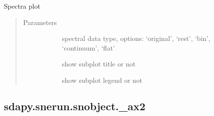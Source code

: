 \documentclass[letterpaper,10pt,english]{sphinxmanual}
\begin{document}
\begin{fulllineitems}
\label{\detokenize{generated/sdapy.snerun.snobject._ax1:sdapy.snerun.snobject._ax1}}
Spectra plot
\begin{quote}\begin{description}
\item[{Parameters}] \leavevmode\begin{description}
\item[{}] \leavevmode{[}\sphinxtitleref{str}{]}
spectral data type, options: ‘original’, ‘rest’, ‘bin’, ‘continuum’, ‘flat’

\item[{}] \leavevmode{[}\sphinxtitleref{bool}{]}
show subplot title or not

\item[{}] \leavevmode{[}\sphinxtitleref{bool}{]}
show subplot legend or not

\end{description}

\end{description}\end{quote}



\begin{description}
\item[{{\hyperref[\detokenize{generated/sdapy.snerun.snelist.__init__:sdapy.snerun.snelist.__init__}]{}}}] \leavevmode
\end{description}



\end{fulllineitems}



\subsection{sdapy.snerun.snobject.\_ax2}
\label{\detokenize{generated/sdapy.snerun.snobject._ax2:sdapy-snerun-snobject-ax2}}\label{\detokenize{generated/sdapy.snerun.snobject._ax2::doc}}
\end{document}
